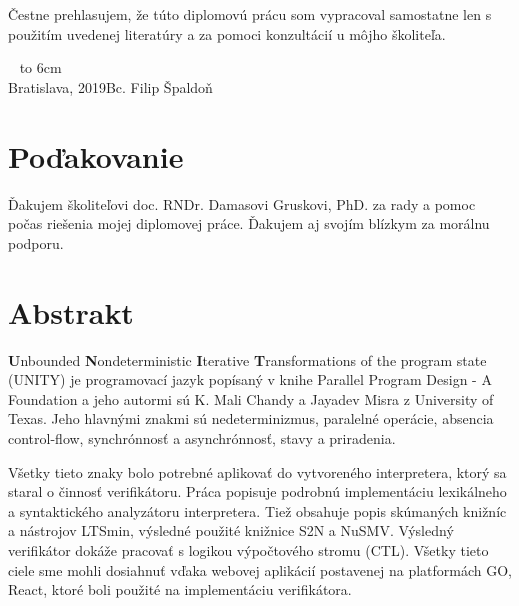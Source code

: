 \documentclass[12pt, a4paper, oneside]{book}
\newcommand\mfauthor{Bc. Filip Špaldoň}
\newcommand\mfplacedate{Bratislava, 2019}
\begin{document}
\thispagestyle{empty}




{~}\vspace{12cm}

\noindent
\begin{minipage}{0.25\textwidth}~\end{minipage}
\begin{minipage}{0.75\textwidth}
Čestne prehlasujem, že túto diplomovú prácu som vypracoval samostatne len s použitím uvedenej literatúry a za pomoci konzultácií u môjho školiteľa.
\newline \newline
\end{minipage}
\vfill
~ \hfill {\hbox to 6cm{\dotfill}} \\
\mfplacedate \hfill \mfauthor
\vfill\eject 

\chapter*{Poďakovanie}\label{chap:thank_you}
Ďakujem školiteľovi doc. RNDr. Damasovi Gruskovi, PhD. za rady a pomoc počas riešenia mojej diplomovej práce. 
Ďakujem aj svojím blízkym za morálnu podporu.

%
%
\chapter*{Abstrakt}\label{chap:abstract_sk}
\textbf{U}nbounded \textbf{N}ondeterministic 
\textbf{I}terative \textbf{T}ransformations of the program state (UNITY) je programovací jazyk popísaný v knihe 
Parallel Program Design - A Foundation a jeho autormi sú K. Mali Chandy a Jayadev Misra z University of Texas. 
Jeho hlavnými znakmi sú nedeterminizmus, paralelné operácie, absencia control-flow, synchrónnosť
a asynchrónnosť, stavy a priradenia. 

Všetky tieto znaky bolo potrebné aplikovať do vytvoreného interpretera, ktorý sa staral o činnosť
verifikátoru. Práca popisuje podrobnú implementáciu lexikálneho a syntaktického analyzátoru interpretera.
Tiež obsahuje popis skúmaných knižníc a nástrojov LTSmin, výsledné použité knižnice S2N a NuSMV.
Výsledný verifikátor dokáže pracovať s logikou výpočtového stromu (CTL). Všetky tieto ciele sme mohli 
dosiahnuť vďaka webovej aplikácií postavenej na platformách GO, React, ktoré boli použité 
na implementáciu verifikátora.
\end{document}
